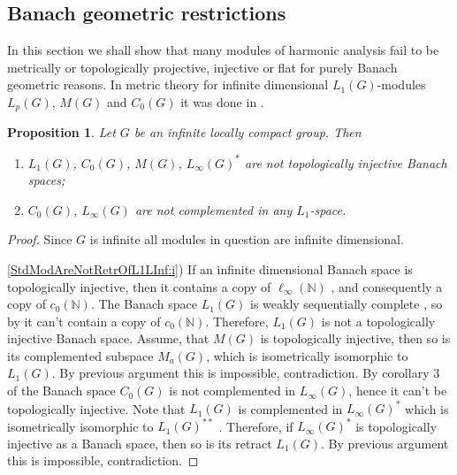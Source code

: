 \documentclass{article}
\theoremstyle{plain}
\newtheorem{proposition}{Proposition}[section]
\theoremstyle{definition}
\newtheorem{proof}{Proof}\def\theproof{}
\begin{document}
\begin{fulltext}

\section{Banach geometric restrictions}
\label{SubSectionBanachGeometricRestriction}

In this section we shall show that many modules of harmonic analysis fail to be metrically or 
topologically projective, injective or flat for purely Banach geometric reasons. In metric theory for infinite dimensional $L_1(G)$-modules $L_p(G)$, $M(G)$ and $C_0(G)$ it was done in \cite[theorems 4.12--4.14]{GravInjProjBanMod}.

\begin{proposition}\label{StdModAreNotRetrOfL1LInf} Let $G$ be an infinite locally compact 
group. Then
\begin{enumerate}
    \item $L_1(G)$, $C_0(G)$, $M(G)$, $L_\infty(G)^*$ are not topologically injective Banach spaces;
    \label{StdModAreNotRetrOfL1LInf:i}
    \item $C_0(G)$, $L_\infty(G)$ are not complemented in any $L_1$-space.
    \label{StdModAreNotRetrOfL1LInf:ii}
\end{enumerate}
\end{proposition}
\begin{proof}
Since $G$ is infinite all modules in question are infinite dimensional.

\ref{StdModAreNotRetrOfL1LInf:i}) If an infinite dimensional Banach space is topologically injective, then it contains a 
copy of $\ell_\infty(\mathbb{N})$ \cite[corollary 1.1.4]{RosOnRelDisjFamOfMeas}, and 
consequently a copy of $c_0(\mathbb{N})$. The Banach space $L_1(G)$ is weakly sequentially 
complete \cite[corollary III.C.14]{WojBanSpForAnalysts}, so by \cite[corollary 5.2.11]{KalAlbTopicsBanSpTh} it can't contain a copy of $c_0(\mathbb{N})$. Therefore, $L_1(G)$ is not a 
topologically injective Banach space. Assume, that $M(G)$ is topologically injective, then so 
is its complemented subspace $M_a(G)$, which is isometrically isomorphic to $L_1(G)$. By 
previous argument this is impossible, contradiction. By corollary 3 of 
\cite{LauMingComplSubspInLInfOfG} the Banach space $C_0(G)$ is not complemented in $L_\infty(G)$, 
hence it can't be topologically injective. Note that $L_1(G)$ is complemented in $L_\infty(G)^*$ 
which is isometrically isomorphic to $L_1(G)^{**}$ \cite[proposition  B10]{DefFloTensNorOpId}. 
Therefore, if $L_\infty(G)^*$ is topologically injective as a Banach space, then so is its 
retract $L_1(G)$. By previous argument this is impossible, contradiction.


\end{proof}
\end{fulltext}
\end{document}
